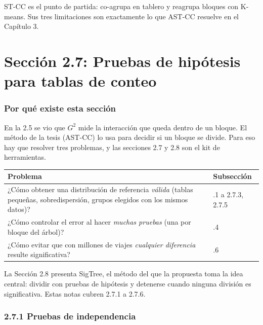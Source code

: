\documentclass[11pt,a4paper]{article}
\newenvironment{idea}{\par\begin{center}\begin{lrbox}{\ideabox}\begin{minipage}{0.9\linewidth}}{\end{minipage}\end{lrbox}\fcolorbox{blue!40!black}{blue!5}{\usebox{\ideabox}}\end{center}}
\begin{document}
\begin{idea}
ST-CC es el punto de partida: co-agrupa en tablero y reagrupa bloques con K-means.
Sus tres limitaciones son exactamente lo que AST-CC resuelve en el Capítulo 3.
\end{idea}

\part{Sección 2.7: Pruebas de hipótesis para tablas de conteo}

\section{Por qué existe esta sección}

En la 2.5 se vio que $G^2$ mide la interacción que queda dentro de un bloque. El
método de la tesis (AST-CC) lo usa para decidir si un bloque se divide. Para eso
hay que resolver tres problemas, y las secciones 2.7 y 2.8 son el kit de
herramientas.

\begin{center}
\renewcommand{\arraystretch}{1.3}
\begin{tabular}{@{}>{\raggedright\arraybackslash}p{9.0cm}>{\raggedright\arraybackslash}p{4.6cm}@{}}
\toprule
\textbf{Problema} & \textbf{Subsección} \\
\midrule
¿Cómo obtener una distribución de referencia \emph{válida} (tablas pequeñas, sobredispersión, grupos elegidos con los mismos datos)? & 2.7.1 a 2.7.3, 2.7.5 \\
\midrule
¿Cómo controlar el error al hacer \emph{muchas pruebas} (una por bloque del árbol)? & 2.7.4 \\
\midrule
¿Cómo evitar que con millones de viajes \emph{cualquier diferencia} resulte significativa? & 2.7.6 \\
\bottomrule
\end{tabular}
\end{center}
La Sección 2.8 presenta SigTree, el método del que la propuesta toma la idea
central: dividir con pruebas de hipótesis y detenerse cuando ninguna división es
significativa. Estas notas cubren 2.7.1 a 2.7.6.

\section{2.7.1 Pruebas de independencia}
\end{document}

